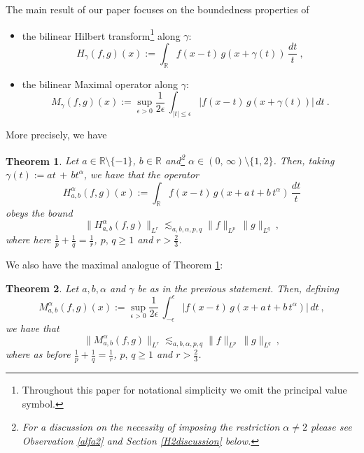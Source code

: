 \documentclass[a4paper,reqno]{amsart}
\numberwithin{equation}{section}
\newtheorem{theorem}{Theorem}[section]
\theoremstyle{definition}
\newcommand{\R}{\mathbb{R}}
\def\a{\alpha}
\def\g{\gamma}
\def\ep{\epsilon}
\begin{document}
The main result of our paper focuses on the boundedness properties of
\begin{itemize}
	\item the bilinear Hilbert transform\footnote{Throughout this paper for notational simplicity we omit the principal value symbol.} along $\g$:
	\begin{equation}\label{bht-gamma}
		H_{\g}(f,g)(x):= \int_{\R} f(x-t)\, g(x+\g(t))\,\frac{dt}{t}\:,
	\end{equation}
	\item the bilinear Maximal operator along $\g$:
	\begin{equation}\label{bmt-gamma}
		M_{\g}(f,g)(x):= \sup_{\ep>0} \frac{1}{2\ep}\,\int_{|t|\leq \ep} |f(x-t)\, g(x+\g(t))|\,dt\:.
	\end{equation}
\end{itemize}
 More precisely, we have

\begin{theorem}\label{main1} Let $a\in\R\setminus\{-1\}$, $b\in \R$ and\footnote{For a discussion on the necessity of imposing the restriction $\a\not=2$ please see Observation \ref{alfa2} and Section \ref{H2discussion} below.} $\a\in(0,\,\infty)\setminus\{1,2\}$. Then, taking $\g(t):=a t\,+\,b t^{\a}$, we have that the operator
	\begin{equation}\label{bht}
		H_{a,b}^\a(f,g)(x):=\int_\R f(x-t)\, g(x+a\,t+b\,t^\a)\,\frac{dt}{t}
	\end{equation}
	obeys the bound
	\begin{equation}\label{mainrmon}
		\|H_{a,b}^\a(f,g)\|_{L^r}\lesssim_{a,b,\a,p,q} \|f\|_{L^p}\,\|g\|_{L^q}\:,
	\end{equation}
	where here $\frac{1}{p}+\frac{1}{q}=\frac{1}{r}$, $p,\,q\geq 1$ and $r>\frac{2}{3}$.
\end{theorem}

We also have the maximal analogue of Theorem \ref{main1}:

\begin{theorem} \label{main2} Let $a,b, \a$ and $\g$ be as in the previous statement. Then, defining
	\begin{equation}\label{mht}
		M_{a,b}^\a(f,g)(x):=\sup_{\ep>0}\frac{1}{2\ep}\,\int_{-\ep}^{\ep} |f(x-t)\, g(x+a\,t+b\,t^\a)|\,dt\:,
	\end{equation}
	we have that
	\begin{equation}\label{mainrmonmax}
		\|M_{a,b}^\a(f,g)\|_{L^r}\lesssim_{a,b,\a,p,q} \|f\|_{L^p}\,\|g\|_{L^q}\:,
	\end{equation}
	where as before $\frac{1}{p}+\frac{1}{q}=\frac{1}{r}$, $p,\,q\geq 1$ and $r>\frac{2}{3}$.
\end{theorem}
\end{document}
